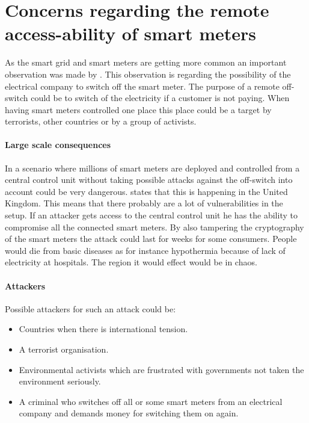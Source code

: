 
\section{Concerns regarding the remote access-ability of smart meters}\label{off_switch}
As the smart grid and smart meters are getting more common an important observation was made by \citet{offswitch}.
This observation is regarding the possibility of the electrical company to switch off the smart meter.
The purpose of a remote off-switch could be to switch of the electricity if a customer is not paying.
When having smart meters controlled one place this place could be a target by terrorists, other countries or by a group of activists. 
\paragraph{Large scale consequences}
In a scenario where millions of smart meters are deployed and controlled from a central control unit without taking possible attacks against the off-switch into account could be very dangerous.
\citet{offswitch} states that this is happening in the United Kingdom.
This means that there probably are a lot of vulnerabilities in the setup.
If an attacker gets access to the central control unit he has the ability to compromise all the connected smart meters.
By also tampering the cryptography of the smart meters the attack could last for weeks for some consumers.
People would die from basic diseases as for instance hypothermia because of lack of electricity at hospitals.
The region it would effect would be in chaos.

\paragraph{Attackers}
Possible attackers for such an attack could be:
\begin{itemize}
\item Countries when there is international tension.
\item A terrorist organisation.
\item Environmental activists which are frustrated with governments not taken the environment seriously.
\item A criminal who switches off all or some smart meters from an electrical company and demands money for switching them on again.
\end{itemize}
